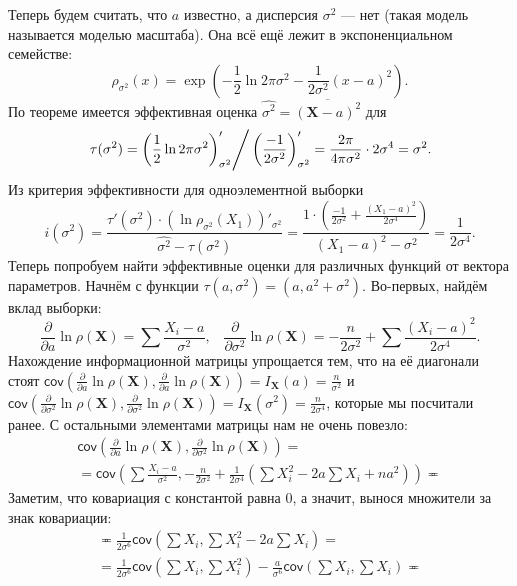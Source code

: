 \begin{example}
    Теперь будем считать, что $a$ известно, а дисперсия $\sigma^2$ --- нет (такая модель называется моделью масштаба). Она всё ещё лежит в экспоненциальном семействе:
    \[
    \rho_{\sigma^2}(x) = \exp\left(-\frac12\ln{2\pi\sigma^2} - \frac{1}{2\sigma^2}(x - a)^2\right).
    \]
    По теореме имеется эффективная оценка $\widehat{\sigma^2} = \overline{(\mathbf X-a)^2}$ для
    $$\left.\tau(\sigma^2) = \left(\frac{1}{2}\ln{2\pi\sigma^2}\right)'_{\sigma^2} \right/ \left(\frac{-1}{2\sigma^2}\right)'_{\sigma^2} = \frac{2\pi}{4\pi\sigma^2}\cdot 2\sigma^4 = \sigma^2.$$
    Из критерия эффективности для одноэлементной выборки
    \[
    i(\sigma^2) = \frac{\tau'(\sigma^2)\cdot (\ln{\rho_{\sigma^2}(X_1)})'_{\sigma^2}}{\widehat{\sigma^2} - \tau(\sigma^2)} = \frac{1 \cdot \left(\frac{-1}{2\sigma^2}+\frac{(X_1-a)^2}{2\sigma^4}\right)}{(X_1-a)^2 - \sigma^2} = \frac{1}{2\sigma^4}.
    \]
    Теперь попробуем найти эффективные оценки для различных функций от вектора параметров. Начнём с функции $\tau(a, \sigma^2) = (a, a^2 + \sigma^2)$. Во-первых, найдём вклад выборки:
    \[
    \frac{\partial}{\partial a} \ln{\rho(\mathbf X)} = \sum \frac{X_i - a}{\sigma^2},\;\;\;
    \frac{\partial}{\partial \sigma^2} \ln{\rho(\mathbf X)} = -\frac{n}{2\sigma^2} + \sum \frac{(X_i-a)^2}{2\sigma^4}.
    \]
    Нахождение информационной матрицы упрощается тем, что на её диагонали стоят $\mathsf{cov}\left(\frac{\partial}{\partial a} \ln{\rho(\mathbf X)}, \frac{\partial}{\partial a} \ln{\rho(\mathbf X)}\right) = I_{\mathbf X}(a) = \frac{n}{\sigma^2}$ и $\mathsf{cov}\left(\frac{\partial}{\partial \sigma^2} \ln{\rho(\mathbf X)}, \frac{\partial}{\partial \sigma^2} \ln{\rho(\mathbf X)}\right) = I_{\mathbf X}(\sigma^2) = \frac{n}{2\sigma^4}$, которые мы посчитали ранее. С остальными элементами матрицы нам не очень повезло:
    \begin{gather*}
        \mathsf{cov}\left(\frac{\partial}{\partial a} \ln{\rho(\mathbf X)}, \frac{\partial}{\partial \sigma^2} \ln{\rho(\mathbf X)}\right) = \\
        = \mathsf{cov}\left(\sum \frac{X_i - a}{\sigma^2}, -\frac{n}{2\sigma^2} + \frac{1}{2\sigma^4}\left(\sum X_i^2 - 2a\sum X_i + na^2\right)\right) \eqcirc
    \end{gather*}
    Заметим, что ковариация с константой равна 0, а значит, вынося множители за знак ковариации:
    \begin{gather*}
        \eqcirc \frac{1}{2\sigma^6}\mathsf{cov}\left(\sum X_i, \sum X_i^2 - 2a\sum X_i\right) = \\
        = \frac{1}{2\sigma^6}\mathsf{cov}\left(\sum X_i, \sum X_i^2\right) - \frac{a}{\sigma^6}\mathsf{cov}\left(\sum X_i, \sum X_i\right) \eqcirc

\end{gather*}
\end{example}
